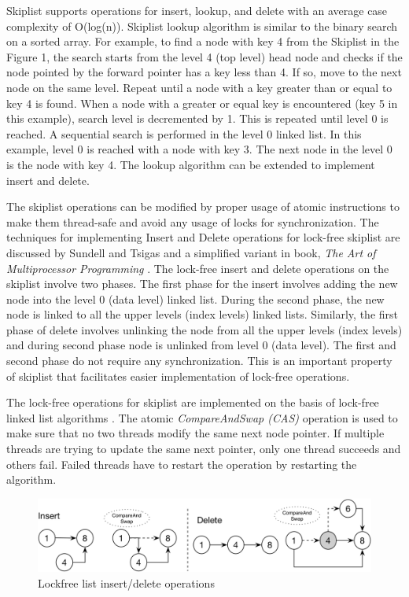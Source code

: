 \documentclass{vldb}
\begin{document}
Skiplist supports operations for insert, lookup, and delete with an average case complexity of O(log(n)). Skiplist lookup algorithm is similar to the binary search on a sorted array. For example, to find a node with key 4 from the Skiplist in the Figure 1, the search starts from the level 4 (top level) head node and checks if the node pointed by the forward pointer has a key less than 4. If so, move to the next node on the same level. Repeat until a node with a key greater than or equal to key 4 is found. When a node with a greater or equal key is encountered (key 5 in this example), search level is decremented by 1. This is repeated until level 0 is reached. A sequential search is performed in the level 0 linked list. In this example, level 0 is reached with a node with key 3. The next node in the level 0 is the node with key 4. The lookup algorithm can be extended to implement insert and delete. 

The skiplist operations can be modified by proper usage of atomic instructions to make them thread-safe and avoid any usage of locks for synchronization. The techniques for implementing Insert and Delete operations for lock-free skiplist are discussed by Sundell and Tsigas \cite{lockfree-skiplist} and a simplified variant in book, \textit{The Art of Multiprocessor Programming} \cite{art-of-multproc}. The lock-free insert and delete operations on the skiplist involve two phases. The first phase for the insert involves adding the new node into the level 0 (data level) linked list. During the second phase, the new node is linked to all the upper levels (index levels) linked lists. Similarly, the first phase of delete involves unlinking the node from all the upper levels (index levels) and during second phase node is unlinked from level 0 (data level). The first and second phase do not require any synchronization. This is an important property of skiplist that facilitates easier implementation of lock-free operations.

The lock-free operations for skiplist are implemented on the basis of lock-free linked list algorithms \cite{valois:lockfree-list}. The atomic \textit{CompareAndSwap (CAS)} operation is used to make sure that no two threads modify the same next node pointer. If multiple threads are trying to update the same next pointer, only one thread succeeds and others fail. Failed threads have to restart the operation by restarting the algorithm.

\begin{figure}[H]
\includegraphics[scale=0.4]{images/fig-3}
\caption{Lockfree list insert/delete operations}
\label{fig:lockfree-list}
\end{figure}
\end{document}
